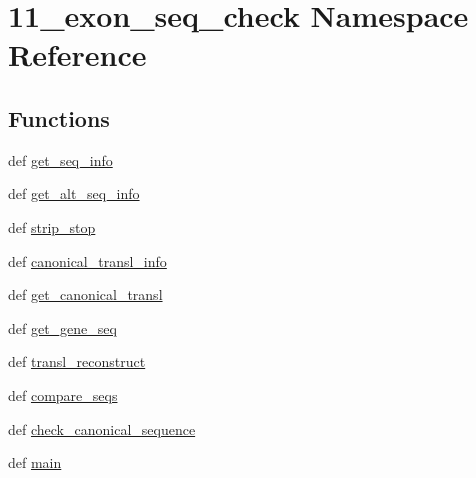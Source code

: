 \hypertarget{namespace11__exon__seq__check}{\section{11\-\_\-exon\-\_\-seq\-\_\-check Namespace Reference}
\label{namespace11__exon__seq__check}
}
\subsection*{Functions}
\begin{DoxyCompactItemize}
\item 
def \hyperlink{namespace11__exon__seq__check_a9ad3dd597d482763624fa453596ed51f}{get\-\_\-seq\-\_\-info}
\item 
def \hyperlink{namespace11__exon__seq__check_a98b8243c1a3d1f50f17118420bdb03c7}{get\-\_\-alt\-\_\-seq\-\_\-info}
\item 
def \hyperlink{namespace11__exon__seq__check_ac80008a6a141f7c702ff574ced0d4fb4}{strip\-\_\-stop}
\item 
def \hyperlink{namespace11__exon__seq__check_a27ee6d49ea1408bfd35d19c54bb820e5}{canonical\-\_\-transl\-\_\-info}
\item 
def \hyperlink{namespace11__exon__seq__check_a2116435cbe5c1be4cc925654704b9740}{get\-\_\-canonical\-\_\-transl}
\item 
def \hyperlink{namespace11__exon__seq__check_a12e4a8ec3346b527b68612409dc620ce}{get\-\_\-gene\-\_\-seq}
\item 
def \hyperlink{namespace11__exon__seq__check_a40b05edcb933853df74456f7b6565efb}{transl\-\_\-reconstruct}
\item 
def \hyperlink{namespace11__exon__seq__check_aa32f75ddb831ff56614267dd4240dcb9}{compare\-\_\-seqs}
\item 
def \hyperlink{namespace11__exon__seq__check_a7b8650b216f2f259de462a727648d37e}{check\-\_\-canonical\-\_\-sequence}
\item 
def \hyperlink{namespace11__exon__seq__check_a14ae6d4e14667cc7339c1fc846ea3c36}{main}
\end{DoxyCompactItemize}


